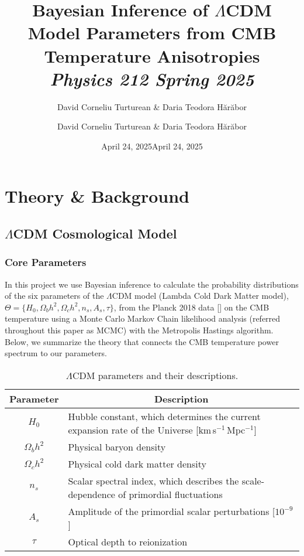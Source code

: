 \documentclass[11pt]{article}
\author{David Corneliu Turturean \& Daria Teodora Hărăbor}
\date{April 24, 2025}
\title{%
  \textrm{Bayesian Inference of $\Lambda$CDM Model Parameters from CMB Temperature Anisotropies}\\[1ex]
  {\large\itshape Physics 212 Spring 2025}%
}
\author{David Corneliu Turturean \& Daria Teodora Hărăbor}
\date{April 24, 2025}
\theoremstyle{definition}
\begin{document}
\maketitle

\tableofcontents

\newpage

\section{Theory \& Background}
\label{sec:theory}

\subsection{$\Lambda$CDM Cosmological Model}

\subsubsection{Core Parameters}
In this project we use Bayesian inference to calculate the probability distributions of the six parameters of the \(\Lambda\)CDM model (Lambda Cold Dark Matter model),
\(\Theta=\{H_0,\Omega_b h^2,\Omega_c h^2,n_s,A_s,\tau\}\), from the Planck 2018 data [\cite{planck2018}] on the CMB temperature using a Monte Carlo Markov Chain likelihood analysis (referred throughout this paper as MCMC) with the Metropolis Hastings algorithm. Below, we summarize the theory that connects the CMB temperature power spectrum to our parameters.

\begin{table}[h!]
  \centering
  \small
  \caption{$\Lambda$CDM parameters and their descriptions.}
  \label{tab:params_short}
  \begin{tabular}{c l}
    \toprule
    \multicolumn{1}{c}{\textbf{Parameter}} & 
    \multicolumn{1}{c}{\textbf{Description}} \\
    \midrule
    $H_0$           & Hubble constant, which determines the current expansion rate of the Universe [km\,s$^{-1}$\,Mpc$^{-1}$] \\
    $\Omega_bh^2$   & Physical baryon density                                                                             \\
    $\Omega_ch^2$   & Physical cold dark matter density                                                                   \\
    $n_s$           & Scalar spectral index, which describes the scale-dependence of primordial fluctuations               \\
    $A_s$           & Amplitude of the primordial scalar perturbations [$10^{-9}$]                                        \\
    $\tau$          & Optical depth to reionization                                                                       \\
    \bottomrule
  \end{tabular}
\end{table}
\end{document}
